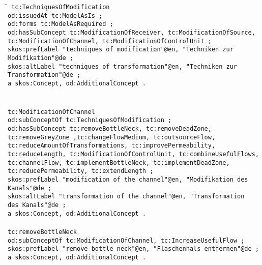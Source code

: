 \documentclass[a4paper,11pt]{article}
\newenvironment{code}{\tt \begin{tabbing}
\hskip12pt\=\hskip12pt\=\hskip12pt\=\hskip12pt\=\hskip5cm\=\hskip5cm\=\kill}
{\end{tabbing}}
\begin{document}
    \begin{code}\tt
        tc:TechniquesOfModification \\
        \> od:issuedAt tc:ModelAsIs ; \\
        \> od:forms tc:ModelAsRequired ; \\
        \> od:hasSubConcept tc:ModificationOfReceiver, tc:ModificationOfSource, \\
        \> tc:ModificationOfChannel, tc:ModificationOfControlUnit ; \\
        \> skos:prefLabel "techniques of modification"@en, "Techniken zur  \\
        \> Modifikation"@de ; \\
        \> skos:altLabel "techniques of transformation"@en, "Techniken zur \\
        \> Transformation"@de ; \\
        \> a skos:Concept, od:AdditionalConcept . \\
        \\
        \\
        tc:ModificationOfChannel \\
        \> od:subConceptOf tc:TechniquesOfModification ; \\
        \> od:hasSubConcept tc:removeBottleNeck, tc:removeDeadZone,  \\
        \> tc:removeGreyZone ,tc:changeFlowMedium, tc:outsourceFlow,  \\
        \> tc:reduceAmountOfTransformations, tc:improvePermeability,  \\
        \> tc:reduceLength, tc:ModificationOfControlUnit, tc:combineUsefulFlows,  \\
        \> tc:channelFlow, tc:implementBottleNeck, tc:implementDeadZone,  \\
        \> tc:reducePermeability, tc:extendLength ; \\
        \> skos:prefLabel "modification of the channel"@en, "Modifikation des  \\
        \> Kanals"@de ; \\
        \> skos:altLabel "transformation of the channel"@en, "Transformation  \\
        \> des Kanals"@de ; \\
        \> a skos:Concept, od:AdditionalConcept . \\
        \\
        tc:removeBottleNeck \\
        \> od:subConceptOf tc:ModificationOfChannel, tc:IncreaseUsefulFlow ; \\
        \> skos:prefLabel "remove bottle neck"@en, "Flaschenhals entfernen"@de ; \\
        \> a skos:Concept, od:AdditionalConcept . \\
        \end{code}
\end{document}
